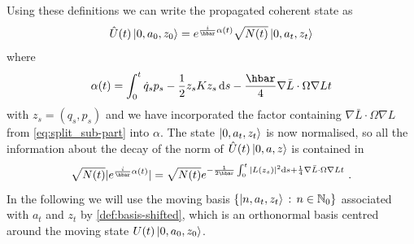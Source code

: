 \documentclass[12pt]{iopart} %
\begin{document}
 Using these definitions we can write the propagated coherent state as
\begin{equation}
\hat U(t)\ket{0,a_0,z_0}=e^{\frac{i}{\hbar}\alpha(t)}\sqrt{N(t)} \ket{0,a_t,z_t}
\end{equation}
where
\begin{equation}
\alpha(t)=\int_0^t \dot q_sp_s-\frac{1}{2}z_sKz_s\,{\rm d} s-\frac{\hbar}{4 }\nabla \bar{L}\cdot \Omega\nabla Lt
\end{equation}
with $z_s=(q_s,p_s)$ and we have incorporated the factor containing $\nabla \bar{L}\cdot \Omega\nabla L$ from \eqref{eq:split_sub-part} into $\alpha$. The state $\ket{0,a_t,z_t}$ is now normalised, so all the information about the decay of the norm of $\hat U(t)\ket{0,a,z}$ is contained in 
\begin{equation}
\sqrt{N(t)}|e^{\frac{i}{\hbar}\alpha(t)}|=\sqrt{N(t)}e^{-\frac{1}{2\hbar}\int_0^t|L(z_s)|^2{\rm d} s+\frac14\nabla \bar{L}\cdot \Omega\nabla Lt}\,\, .
\end{equation}
In the following we will use the moving basis $\{\ket{n,a_t,z_t}\, :\, n\in \mathbb{N}_0\}$ associated with $a_t$ and $z_t$ by \eqref{def:basis-shifted}, which is an orthonormal basis centred around the moving state $U(t)\ket{0,a_0,z_0}$. 
\end{document}
